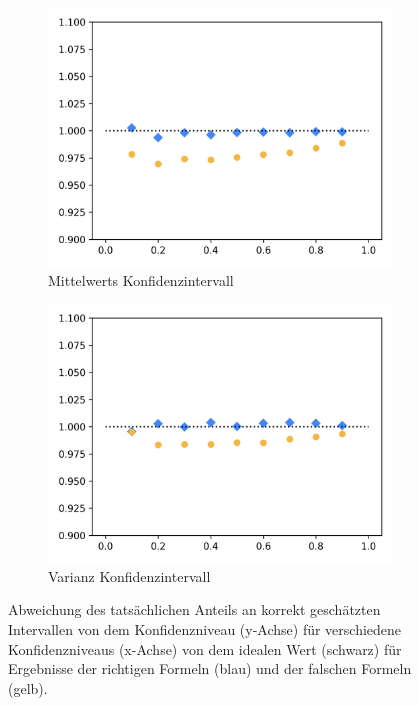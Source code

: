 \documentclass[10pt,twocolumn]{scrartcl}
\begin{document}
		\begin{figure}[h]%
			\centering
			\begin{subfigure}[c]{1\columnwidth}
				\includegraphics[width=0.9\columnwidth]{images/mean_interval.png}
				\caption{Mittelwerts Konfidenzintervall}
				\label{fig_mean_interval_dot}
			\end{subfigure}
			\begin{subfigure}[c]{1\columnwidth}
				\includegraphics[width=0.9\columnwidth]{images/var_interval.png}
				\caption{Varianz Konfidenzintervall}
				\label{fig_var_interval_dot}
			\end{subfigure}
			\caption{Abweichung des tatsächlichen Anteils an korrekt geschätzten Intervallen von dem Konfidenzniveau (y-Achse) für verschiedene Konfidenzniveaus (x-Achse) von dem idealen Wert (schwarz) für Ergebnisse der richtigen Formeln (blau) und der falschen Formeln (gelb).}
		\end{figure}
\end{document}
